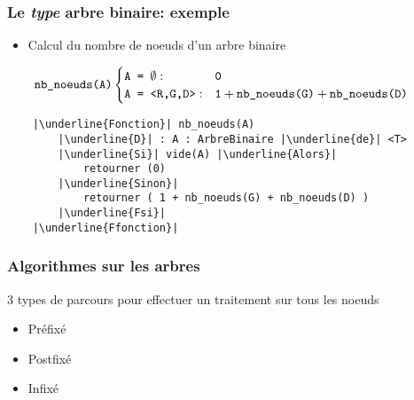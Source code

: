 \documentclass[table,handout,tikz,12pt,svgnames]{beamer}
\begin{document}
\begin{frame}[fragile=singleslide]
	\frametitle{Le \textit{type} arbre binaire: exemple}
	\begin{block}{} %
		\begin{itemize}
			\item Calcul du nombre de noeuds d'un arbre binaire
		\end{itemize}
	\end{block}

	\begin{block}{}%
		\vspace{-1.5em}
		\small
		\[
		\hspace{-0.5cm}
		\texttt{nb\_noeuds(A)} 
		\begin{cases}
		\texttt{A = $\emptyset$}: & \texttt{0}\\
		\texttt{A = <R,G,D>}: & \texttt{1} + \texttt{nb\_noeuds(G)} + \texttt{nb\_noeuds(D)}
		
		\end{cases}
		\]
		\vspace{-1em}
	\end{block}

	\begin{block}{}
		\begin{verbatim}
	|\underline{Fonction}| nb_noeuds(A)
		|\underline{D}| : A : ArbreBinaire |\underline{de}| <T>
		|\underline{Si}| vide(A) |\underline{Alors}|
			retourner (0)
		|\underline{Sinon}|
			retourner ( 1 + nb_noeuds(G) + nb_noeuds(D) )
		|\underline{Fsi}|
	|\underline{Ffonction}|		
		\end{verbatim}		
	\end{block}
\end{frame}


\begin{frame}[fragile=singleslide]
	\frametitle{Algorithmes sur les arbres}
	\begin{block}{3 types de parcours pour effectuer un traitement sur tous les noeuds}
		\begin{itemize}
			\item Préfixé
			\item Postfixé
			\item Infixé
		\end{itemize}
	\end{block}
\end{frame}
\end{document}
